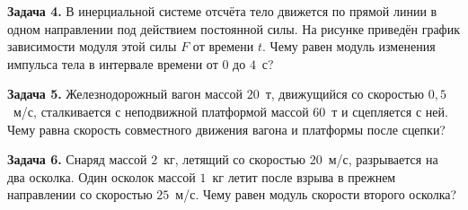 \begin{taskbasic}[code={\label{task:momentum_v6_n3}}]
\textbf{Задача 4.} В инерциальной системе отсчёта тело движется по прямой линии в одном направлении под действием постоянной силы. На рисунке приведён график зависимости модуля этой силы $F$ от времени $t$. Чему равен модуль изменения импульса тела в интервале времени от $0$ до $4$~с?

\nopagebreak\smallskip
\begin{center}
\end{center}

\end{taskbasic}

\begin{taskbasic}[code={\label{task:momentum_v9_n3}}]
\textbf{Задача 5.} Железнодорожный вагон массой $20$~т, движущийся со скоростью $0{,}5$~м/с, сталкивается с неподвижной платформой массой $60$~т и сцепляется с ней. Чему равна скорость совместного движения вагона и платформы после сцепки?

\end{taskbasic}

\begin{taskbasic}[code={\label{task:momentum_v10_n3}}]
\textbf{Задача 6.} Снаряд массой $2$~кг, летящий со скоростью $20$~м/с, разрывается на два осколка. Один осколок массой $1$~кг летит после взрыва в прежнем направлении со скоростью $25$~м/с. Чему равен модуль скорости второго осколка?

\end{taskbasic}


